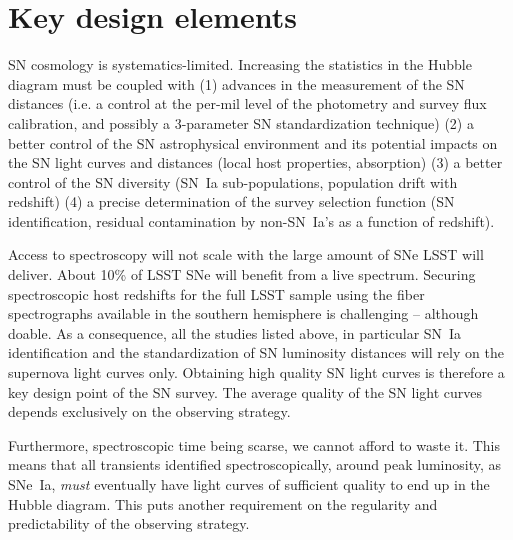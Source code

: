\documentclass [11pt,a4paper]{article}
\begin{document}
\renewcommand\appendix{\par
  \setcounter{section}{0}
  \setcounter{subsection}{0}
  \setcounter{figure}{0}
  \setcounter{table}{0}
  \renewcommand\thesection{Appendix} %
  \renewcommand\thefigure{\Alph{section}\arabic{figure}}
  \renewcommand\thetable{\Alph{section}\arabic{table}} 
}
 

\tableofcontents



\section{Key design elements}

SN cosmology is systematics-limited. Increasing the statistics in the
Hubble diagram must be coupled with (1) advances in the measurement of
the SN distances (i.e.  a control at the per-mil level of the
photometry and survey flux calibration, and possibly a 3-parameter SN
standardization technique) (2) a better control of the SN
astrophysical environment and its potential impacts on the SN
light curves and distances (local host properties, absorption) (3) a
better control of the SN diversity (SN~Ia sub-populations, population
drift with redshift) (4) a precise determination of the survey
selection function (SN identification, residual contamination by
non-SN~Ia's as a function of redshift).

Access to spectroscopy will not scale with the large amount of SNe
LSST will deliver.  About 10\% of LSST SNe will benefit from a live
spectrum.  Securing spectroscopic host redshifts for the full LSST
sample using the fiber spectrographs available in the southern
hemisphere is challenging -- although doable.  As a consequence, all
the studies listed above, in particular SN~Ia identification and the
standardization of SN luminosity distances will rely on the supernova
light curves only.  Obtaining high quality SN light curves is
therefore a key design point of the SN survey.  The average quality of
the SN light curves depends exclusively on the observing strategy.

Furthermore, spectroscopic time being scarse, we cannot afford to
waste it.  This means that all transients identified
spectroscopically, around peak luminosity, as SNe~Ia, {\em must}
eventually have light curves of sufficient quality to end up in the
Hubble diagram.  This puts another requirement on the regularity and
predictability of the observing strategy.
\end{document}
